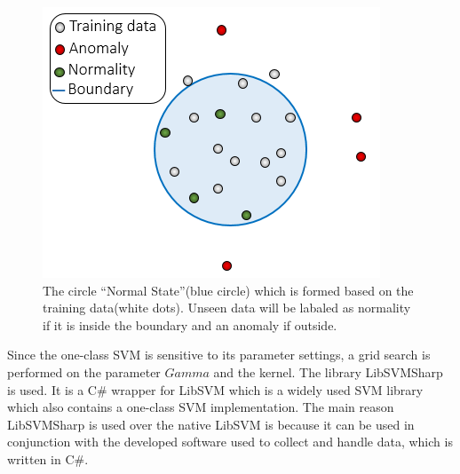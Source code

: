 \begin{figure}
    \centering
  \includegraphics[width=0.75\columnwidth]{graphics/svm.png}
    \caption{The circle ``Normal State''(blue circle) which is formed based on the training data(white dots). Unseen data will be labaled as normality if it is inside the boundary and an anomaly if outside.}
    \label{[FIGURE] OneClass SVM}
\end{figure}

Since the one-class SVM is sensitive\cite{oneClassSVM} to its parameter settings, a grid search is performed on the parameter $Gamma$ and the kernel.
The library LibSVMSharp\cite{libsvmsharp} is used. It is a C\# wrapper for LibSVM\cite{libsvm} which is a widely used SVM library which also contains a one-class SVM implementation. The main reason LibSVMSharp is used over the native LibSVM is because it can be used in conjunction with the developed software used to collect and handle data, which is written in C\#.

